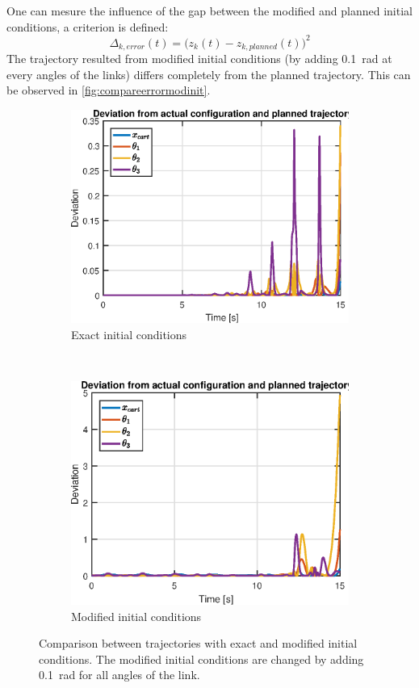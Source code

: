 \documentclass[a4paper,12pt]{article}
\begin{document}
One can mesure the influence of the gap between the modified and planned initial conditions, a criterion is defined:
\[\Delta_{k,error}(t) = \big(z_k(t)-z_{k,planned}(t)\big)^2\]
The trajectory resulted from modified initial conditions (by adding \SI{0.1}{\radian} at every angles of the links) differs completely from the planned trajectory. This can be observed in \autoref{fig:compareerrormodinit}.
\begin{figure}[H]
    \centering
    \begin{subfigure}[h]{0.48\textwidth}
        \centering
        \includegraphics[width=1\textwidth]{illustrations/graph_error_init.eps}
        \caption{Exact initial conditions}
    \end{subfigure}%
    ~ 
    \begin{subfigure}[h]{0.48\textwidth}
        \centering
        \includegraphics[width=1\textwidth]{illustrations/graph_error_mod.eps}
        \caption{Modified initial conditions}
    \end{subfigure}
    \caption{Comparison between trajectories with exact and modified initial conditions. The modified initial conditions are changed by adding \SI{0.1}{\radian} for all angles of the link.}
    \label{fig:compareerrormodinit}
\end{figure}
\end{document}
